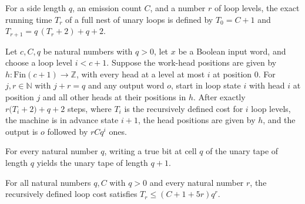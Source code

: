 \begin{definition}
\label{Turing.FinTM.catalogPolyCost}
\leanok
For a side length $q$, an emission count $C$, and a number $r$ of loop
levels, the exact running time $T_r$ of a full nest of unary loops is
defined by $T_0 = C + 1$ and $T_{r+1} = q\,(T_r + 2) + q + 2$.
\end{definition}

\begin{lemma}
\label{Turing.FinTM.catalogPoly_loop}
\leanok
{}
Let $c,C,q$ be natural numbers with $q>0$, let $x$ be a Boolean input word, and choose a
loop level $i<c+1$. Suppose the work-head positions are given by $h : \text{Fin}(c+1)
\to \mathbb{Z}$, with every head at a level at most $i$ at position $0$. For
$j,r\in\mathbb{N}$ with $j+r=q$ and any output word $o$, start in loop state $i$ with
head $i$ at position $j$ and all other heads at their positions in $h$. After exactly
$r\bigl(T_i+2\bigr)+q+2$ steps, where $T_i$ is the recursively defined cost for $i$ loop
levels, the machine is in advance state $i+1$, the head positions are given by $h$, and
the output is $o$ followed by $rCq^i$ ones.
\end{lemma}

\begin{lemma}
\label{Turing.FinTM.catalogPolyTape_write}
\leanok
{}
For every natural number $q$, writing a true bit at cell $q$ of the unary tape of length
$q$ yields the unary tape of length $q+1$.
\end{lemma}

\begin{lemma}
\label{Turing.FinTM.catalogPolyCost_le}
\leanok
{}
For all natural numbers $q,C$ with $q>0$ and every natural number $r$, the recursively
defined loop cost satisfies $T_r\le (C+1+5r)q^r$.
\end{lemma}


